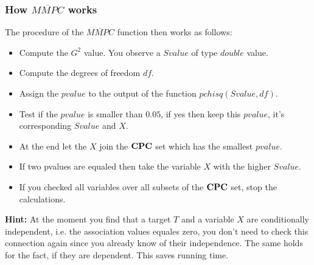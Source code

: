 			\subsubsection{How $\overline{MMPC}$ works}

				 The procedure of the $\overline{MMPC}$ function then works as follows:

				\begin{itemize}
					\item Compute the $G^{2}$ value. You observe a $Svalue$ of type $double$ value.
					\item Compute the degrees of freedom $df$.
					\item Assign the $pvalue$ to the output of the function $pchisq(Svalue, df)$.
					\item Test if the $pvalue$ is smaller than $0.05$, if yes then keep this $pvalue$, it's corresponding $Svalue$ and $X$.
					\item At the end let the $X$ join the ${\textbf{CPC}}$ set which has the smallest $pvalue$.
					\item If two pvalues are equaled then take the variable $X$ with the higher $Svalue$.
					\item If you checked all variables over all subsets of the ${\textbf{CPC}}$ set, stop the calculations.
				\end{itemize}

				\textbf{Hint:} At the moment you find that a target $T$ and a variable $X$ are conditionally independent, i.e. the association values equales zero, you don't need to check this connection again since you already know of their independence. The same holds for the fact, if they are dependent. This saves running time.











